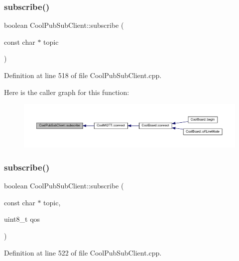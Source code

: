 \subsubsection{\texorpdfstring{subscribe()}{subscribe()}\hspace{0.1cm}{\footnotesize\ttfamily [1/2]}}
{\footnotesize\ttfamily boolean Cool\+Pub\+Sub\+Client\+::subscribe (\begin{DoxyParamCaption}\item[{const char $\ast$}]{topic }\end{DoxyParamCaption})}



Definition at line 518 of file Cool\+Pub\+Sub\+Client.\+cpp.

Here is the caller graph for this function\+:
\nopagebreak
\begin{figure}[H]
\begin{center}
\leavevmode
\includegraphics[width=350pt]{class_cool_pub_sub_client_ac1ebc9ad874128aefa985d78496d2e8f_icgraph}
\end{center}
\end{figure}
\mbox{\label{class_cool_pub_sub_client_aebf684e98588c52a72af1014f7957bee}} 
\subsubsection{\texorpdfstring{subscribe()}{subscribe()}\hspace{0.1cm}{\footnotesize\ttfamily [2/2]}}
{\footnotesize\ttfamily boolean Cool\+Pub\+Sub\+Client\+::subscribe (\begin{DoxyParamCaption}\item[{const char $\ast$}]{topic,  }\item[{uint8\+\_\+t}]{qos }\end{DoxyParamCaption})}



Definition at line 522 of file Cool\+Pub\+Sub\+Client.\+cpp.


